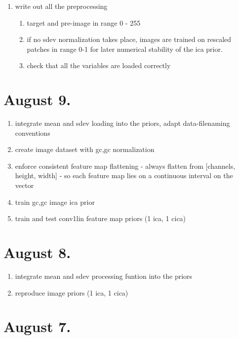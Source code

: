 \documentclass{article}
\begin{document}
\begin{enumerate}
	\item write out all the preprocessing
	\begin{enumerate}
		\item target and pre-image in range 0 - 255
		\item if no sdev normalization takes place, images are trained on rescaled patches in range 0-1 for later numerical stability of the ica prior.
		\item check that all the variables are loaded correctly
	\end{enumerate}
\end{enumerate}


\section{August 9.}

\begin{enumerate}
	\item integrate mean and sdev loading into the priors, adapt data-filenaming conventions
	\item create image dataset with gc,gc normalization
	\item enforce consistent feature map flattening - always flatten from [channels, height, width] - so each feature map lies on a continuous interval on the vector
	\item train gc,gc image ica prior
	\item train and test conv1lin feature map priors (1 ica, 1 cica)
\end{enumerate}

\section{August 8.}

\begin{enumerate}
	\item integrate mean and sdev processing funtion into the priors
	\item reproduce image priors (1 ica, 1 cica)
\end{enumerate}


\section*{August 7.}
\end{document}
